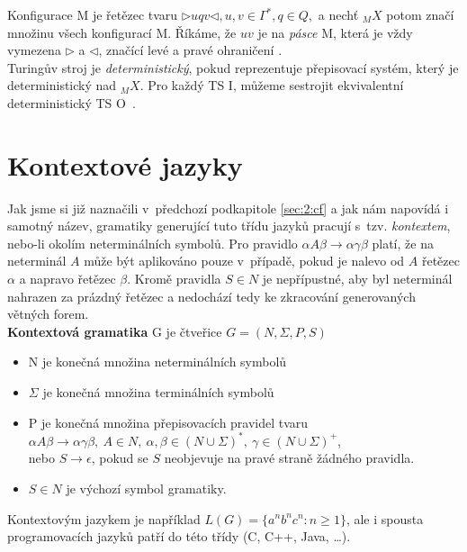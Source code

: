 Konfigurace M je řetězec tvaru $\rhd uqv \lhd, u,v \in \Gamma^*, q \in Q,$ a nechť $_{M}X$ potom značí množinu všech konfigurací M. Říkáme, že $uv$ 
je na \textit{pásce} M, která je vždy vymezena $\rhd$ a $\lhd$, značící levé a pravé ohraničení \cite[str. 200]{Meduna2014}. \\

Turingův stroj je \textit{deterministický}, pokud reprezentuje přepisovací systém, který je deterministický nad $_{M}X$.
Pro každý TS I, můžeme sestrojit ekvivalentní deterministický TS O~\cite[str. 203]{Meduna2014}.

\section{Kontextové jazyky} \label{sec:2:cg}
Jak jsme si již naznačili v~předchozí podkapitole \ref{sec:2:cf} a jak nám napovídá i samotný název, gramatiky generující
tuto třídu jazyků pracují s~tzv. \textit{kontextem}, nebo-li okolím neterminálních symbolů. Pro pravidlo 
$\alpha A \beta \rightarrow \alpha\gamma\beta$ platí, že na neterminál $A$ může být aplikováno pouze v~případě,
pokud je nalevo od $A$ řetězec $\alpha$ a napravo řetězec $\beta$. Kromě pravidla $S \in N$ je nepřípustné, aby byl
neterminál nahrazen za prázdný řetězec a nedochází tedy ke zkracování generovaných větných forem. \\

\textbf{Kontextová gramatika} G je čtveřice $G = (N, \Sigma, P, S)$
\begin{itemize}
\item N je konečná množina neterminálních symbolů
\item $\Sigma$ je konečná množina terminálních symbolů
\item P je konečná množina přepisovacích pravidel tvaru \\
$ \alpha A \beta \rightarrow \alpha\gamma\beta, \ A \in N, \ \alpha, \beta \in (N \cup \Sigma)^*, \ \gamma \in (N \cup \Sigma)^+$, \\
nebo $ S \rightarrow \epsilon$, pokud se $S$ neobjevuje na pravé straně žádného pravidla.
\item $S \in N$ je výchozí symbol gramatiky.
\end{itemize}
\vspace*{\baselineskip}

\Bat{} Kontextovým jazykem je například $L(G) = \{a^nb^nc^n: n \geq 1\}$, ale i spousta programovacích jazyků patří do této třídy (C, C++, Java, \dots). \\

